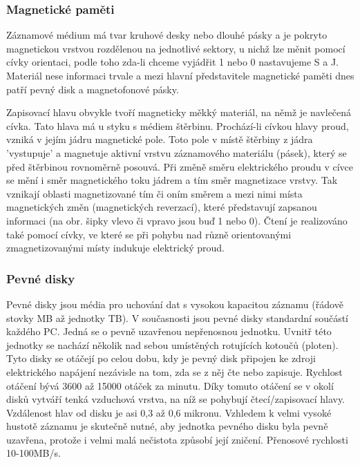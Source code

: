 \subsubsection{Magnetické paměti}
Záznamové médium má tvar kruhové desky nebo dlouhé pásky a je pokryto magnetickou vrstvou rozdělenou na jednotlivé sektory, u nichž lze měnit pomocí cívky orientaci, podle toho zda-li chceme vyjádřit 1 nebo 0 nastavujeme S a J. Materiál nese informaci trvale a mezi hlavní představitele magnetické paměti dnes patří pevný disk a magnetofonové pásky.

Zapisovací hlavu obvykle tvoří magneticky měkký materiál, na němž je navlečená cívka. Tato hlava má u styku s médiem štěrbinu. Prochází-li cívkou hlavy proud, vzniká v jejím jádru magnetické pole. Toto pole v místě štěrbiny z jádra 'vystupuje' a magnetuje aktivní vrstvu záznamového materiálu (pásek), který se před štěrbinou rovnoměrně posouvá. Při změně směru elektrického proudu v cívce se mění i směr magnetického toku jádrem a tím směr magnetizace vrstvy. Tak vznikají oblasti magnetizované tím či oním směrem a mezi nimi místa magnetických změn (magnetických reverzací), které představují zapsanou informaci (na obr. šipky vlevo či vpravo jsou buď 1 nebo 0). Čtení je realizováno také pomocí cívky, ve které se při pohybu nad různě orientovanými zmagnetizovanými místy indukuje elektrický proud.


\subsubsection{Pevné disky}
Pevné disky jsou média pro uchování dat s vysokou kapacitou záznamu (řádově stovky MB až jednotky TB). V současnosti jsou pevné disky standardní součástí každého PC. Jedná se o pevně uzavřenou nepřenosnou jednotku. Uvnitř této jednotky se nachází několik nad sebou umístěných rotujících kotoučů (ploten). Tyto disky se otáčejí po celou dobu, kdy je pevný disk připojen ke zdroji elektrického napájení nezávisle na tom, zda se z něj čte nebo zapisuje. Rychlost otáčení bývá 3600 až 15000 otáček za minutu. Díky tomuto otáčení se v okolí disků vytváří tenká vzduchová vrstva, na níž se pohybují čtecí/zapisovací hlavy. Vzdálenost hlav od disku je asi 0,3 až 0,6 mikronu. Vzhledem k velmi vysoké hustotě záznamu je skutečně nutné, aby jednotka pevného disku byla pevně uzavřena, protože i velmi malá nečistota způsobí její zničení. Přenosové rychlosti 10-100MB/s.

